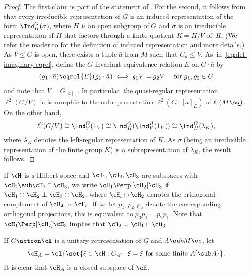 \begin{proof}
The first claim is part of the statement of \cite[Th.\,4.2]{Tsankov2012}. For the second, it follows from \cite[Th.\,4.2]{Tsankov2012} that every irreducible representation of $G$ is an induced representation of the form $\Ind_H^G(\sigma)$, where $H$ is an open subgroup of $G$ and $\sigma$ is an irreducible representation of $H$ that factors through a finite quotient $K = H/V$ of~$H$. (We refer the reader to \cite{Tsankov2012} for the definition of induced representation and more details.) As $V \leq G$ is open, there exists a tuple $\bar a$ from $M$ such that $G_{\bar a} \leq V$. As~in~\eqref{eq:def-imaginary-eqrel}, define the $G$-invariant equivalence relation $E$ on $G \cdot \bar a$ by
\begin{equation*}
(g_1 \cdot \bar a) \eqrel{E} (g_2 \cdot \bar a) \iff g_1V = g_2V \quad \text{ for } g_1, g_2 \in G
\end{equation*}
and note that $V = G_{[\bar a]_E}$. In particular, the quasi-regular representation $\ell^2(G/V)$ is isomorphic to the subrepresentation $\ell^2(G \cdot [\bar a]_E)$ of $\ell^2(M\eq)$. On the other hand,
\begin{equation*}
\ell^2(G/V) \cong \Ind_V^G(1_V) \cong \Ind_H^G(\Ind_V^H(1_V)) \cong \Ind_H^G(\lambda_K),
\end{equation*}
where $\lambda_K$ denotes the left-regular representation of $K$. As $\sigma$ (being an irreducible representation of the finite group $K$) is a subrepresentation of $\lambda_K$, the result follows.
\end{proof}

If $\cH$ is a Hilbert space and $\cH_1, \cH_2, \cH_3$ are subspaces with $\cH_2 \sub \cH_1 \cap \cH_3$, we write $\cH_1 \Perp[\cH_2] \cH_3$ if $\cH_1 \ominus \cH_2 \perp \cH_3 \ominus \cH_2$, where $\cH_i \ominus \cH_2$ denotes the orthogonal complement of $\cH_2$ in $\cH_i$.
If we let $p_1, p_2, p_3$ denote the corresponding orthogonal projections, this is equivalent to $p_3 p_1 = p_2 p_1$. Note that $\cH_1 \Perp[\cH_2] \cH_3$ implies that $\cH_2 = \cH_1 \cap \cH_3$.

If $G \actson \cH$ is a unitary representation of $G$ and $A \sub M\eq$, let
\begin{equation}
\label{eq:defHA}
\cH_A = \cl{\set{\xi \in \cH : G_{A'} \cdot \xi = \xi \text{ for some finite } A' \sub A}}.
\end{equation}
It is clear that $\cH_A$ is a closed subspace of $\cH$.

